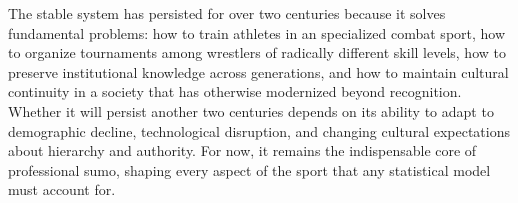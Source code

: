 The stable system has persisted for over two centuries because it solves fundamental problems: how to train athletes in an specialized combat sport, how to organize tournaments among wrestlers of radically different skill levels, how to preserve institutional knowledge across generations, and how to maintain cultural continuity in a society that has otherwise modernized beyond recognition. Whether it will persist another two centuries depends on its ability to adapt to demographic decline, technological disruption, and changing cultural expectations about hierarchy and authority. For now, it remains the indispensable core of professional sumo, shaping every aspect of the sport that any statistical model must account for.
